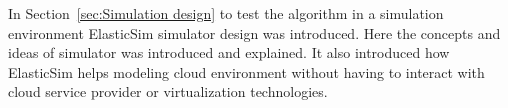  In Section~\ref{sec:Simulation design} to test the algorithm in a simulation environment ElasticSim simulator design was introduced. Here  the concepts and ideas of simulator was introduced and explained. It also introduced how ElasticSim helps modeling cloud environment without having to interact with cloud service provider or virtualization technologies.
